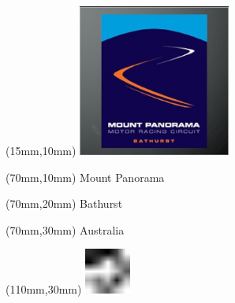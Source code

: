 \null\newpage
\begin{textblock*}{50mm}(15mm,10mm)%
\includegraphics[width=50mm]{LG/2015-05-20_00087.png}
\end{textblock*}
\begin{textblock*}{130mm}(70mm,10mm)%
{\fontsize{20}{20}\selectfont Mount Panorama}\\
\end{textblock*}
\begin{textblock*}{120mm}(70mm,20mm)%
{\fontsize{16}{16}\selectfont Bathurst}\\
\end{textblock*}
\begin{textblock*}{120mm}(70mm,30mm)%
{\fontsize{12}{12}\selectfont Australia}
\end{textblock*}
\begin{textblock*}{30mm}(110mm,30mm)%
\centering
\includegraphics[height=15mm]{icons/fa-rotate-left.pdf}
\end{textblock*}
